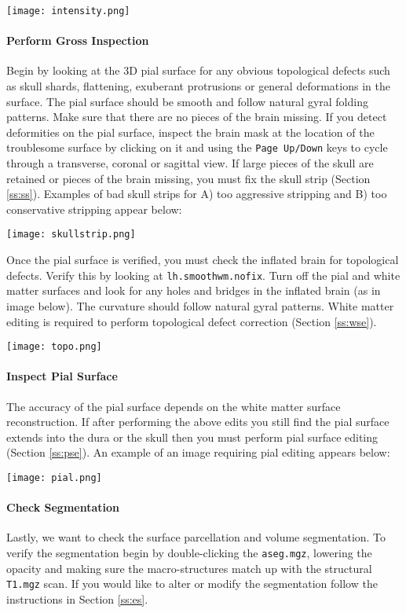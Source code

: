 \documentclass[paper=a4, fontsize=11pt]{scrartcl} %
\numberwithin{equation}{section} %
\numberwithin{figure}{section} %
\numberwithin{table}{section} %
\begin{document}
\texttt{[image: intensity.png]}

\paragraph{Perform Gross Inspection} Begin by looking at the 3D pial surface for any obvious topological defects such as skull shards, flattening, exuberant protrusions or general deformations in the surface.  The pial surface should be smooth and follow natural gyral folding patterns.  Make sure that there are no pieces of the brain missing.  If you detect deformities on the pial surface, inspect the brain mask at the location of the troublesome surface by clicking on it and using the \texttt{Page Up/Down} keys to cycle through a transverse, coronal or sagittal view. If large pieces of the skull are retained or pieces of the brain missing, you must fix the skull strip (Section \ref{ss:ss}).  Examples of bad skull strips for A) too aggressive stripping and B) too conservative stripping appear below:

\texttt{[image: skullstrip.png]}

Once the pial surface is verified, you must check the inflated brain for topological defects.  Verify this by looking at \texttt{lh.smoothwm.nofix}.  Turn off the pial and white matter surfaces and look for any holes and bridges in the inflated brain (as in image below).  The curvature should follow natural gyral patterns.  White matter editing is required to perform topological defect correction (Section \ref{ss:wse}). 

\texttt{[image: topo.png]}

\paragraph{Inspect Pial Surface}  The accuracy of the pial surface depends on the white matter surface reconstruction. If after performing the above edits you still find the pial surface extends into the dura or the skull then you must perform pial surface editing (Section \ref{ss:pse}).  An example of an image requiring pial editing appears below:

\texttt{[image: pial.png]}

\paragraph{Check Segmentation}  Lastly, we want to check the surface parcellation and volume segmentation.  To verify the segmentation begin by double-clicking the \texttt{aseg.mgz}, lowering the opacity and making sure the macro-structures match up with the structural \texttt{T1.mgz} scan.  If you would like to alter or modify the segmentation follow the instructions in Section \ref{ss:es}.
\end{document}
